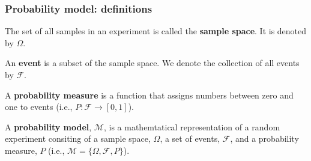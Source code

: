 \begin{frame}
    \frametitle{Probability model: definitions}

    \begin{probDef*}

        The set of all samples in an experiment is called the \textbf{sample
        space}. It is denoted by $\Omega$.

    \end{probDef*}


    \footnotesize
    \begin{probDef*}[Event]

        An \textbf{event} is a subset of the sample space. We denote the
        collection of all events by $\mathcal{F}$.

    \end{probDef*}

    \begin{probDef*}

        A \textbf{probability measure} is a function that assigns numbers
        between zero and one to events (i.e., $P:\mathcal{F}\rightarrow
        [0,1]$).

    \end{probDef*}

    \begin{probDef*}

        A \textbf{probability model}, $\mathcal{M}$, is a mathemtatical representation of a
        random experiment consiting of a sample space, $\Omega$, a set of
        events, $\mathcal{F}$, and a probability measure, $P$ (i.e.,
        $\mathcal{M}=\{\Omega,\mathcal{F},P\}$).

    \end{probDef*}
    \normalsize

\end{frame}

